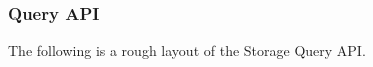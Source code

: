 \documentclass[12pt,letterpaper]{article}
\begin{document}



\subsubsection{Query API}
The following is a rough layout of the Storage Query API. 
\end{document}
